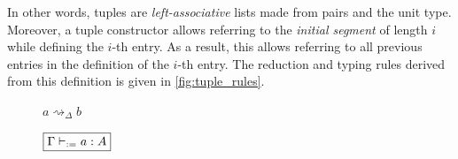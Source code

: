 \documentclass[twoside]{report}
\begin{document}
In other words, tuples are \emph{left-associative} lists made from pairs and the unit type. Moreover, a tuple constructor allows referring to the \emph{initial segment} of length $i$ while defining the $i$-th entry. As a result, this allows referring to all previous entries in the definition of the $i$-th entry. The reduction and typing rules derived from this definition is given in \cref{fig:tuple_rules}.

\begin{figure}[ht]
    $\boxed{a \rightsquigarrow_\Delta b}$

    \begin{prooftree}
    \end{prooftree}

    \begin{prooftree}
    \end{prooftree}

    \begin{prooftree}
    \end{prooftree}

    \vspace{1em}
    $\boxed{\Gamma \vdash_{:=} a : A}$

    \begin{prooftree}
    \end{prooftree}


\end{figure}
\end{document}
